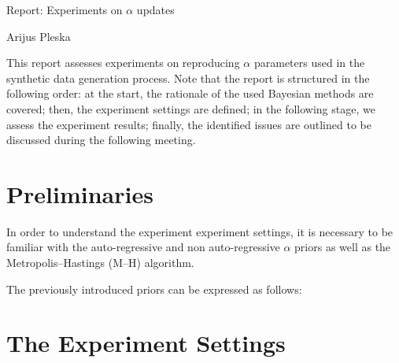 \documentclass[12pt]{article}
\begin{document}
\begingroup  
  \centering
  \large Report: Experiments on $\alpha$ updates \par
  \large Arijus Pleska \par
\endgroup

\par This report assesses experiments on reproducing $\alpha$ parameters used in the synthetic data generation process. Note that the report is structured in the following order: at the start, the rationale of the used Bayesian methods are covered; then, the experiment settings are defined; in the following stage, we assess the experiment results; finally, the identified issues are outlined to be discussed during the following meeting.

\section*{Preliminaries}

\par In order to understand the experiment experiment settings, it is necessary to be familiar with the auto-regressive and non auto-regressive $\alpha$ priors as well as the Metropolis--Hastings (M--H) algorithm.

\par The previously introduced priors can be expressed as follows:


\section*{The Experiment Settings}
\end{document}
